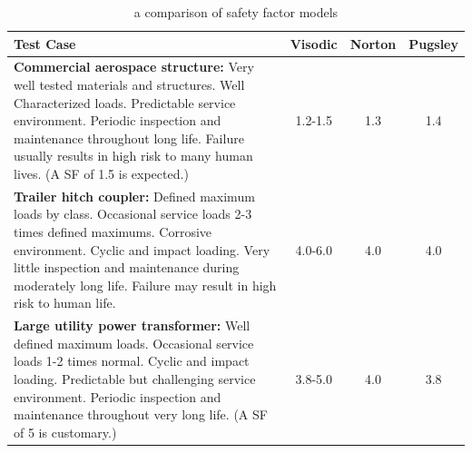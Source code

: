 \begin{table}
    \centering
    \small
    \begin{tabular}{p{} c c c}
      \toprule
        Test Case & Visodic & Norton & Pugsley \\
      \midrule
        \textbf{Commercial aerospace structure:} Very well tested materials and structures. Well Characterized loads. Predictable service environment. Periodic inspection and maintenance throughout long life. Failure usually results in high risk to many human lives. (A SF of 1.5 is expected.)
        & 1.2-1.5
        & 1.3
        & 1.4
        \\
        \textbf{Trailer hitch coupler:} Defined maximum loads by class. Occasional service loads 2-3 times defined maximums. Corrosive environment. Cyclic and impact loading. Very little inspection and maintenance during moderately long life. Failure may result in high risk to human life.
        & 4.0-6.0
        & 4.0
        & 4.0
        \\
        \textbf{Large utility power transformer:} Well defined maximum loads. Occasional service loads 1-2 times normal. Cyclic and impact loading. Predictable but challenging service environment. Periodic inspection and maintenance throughout very long life. (A SF of 5 is customary.)
        & 3.8-5.0
        & 4.0
        & 3.8
        \\
      \bottomrule
    \end{tabular}
  \caption{a comparison of safety factor models}
\end{table}
